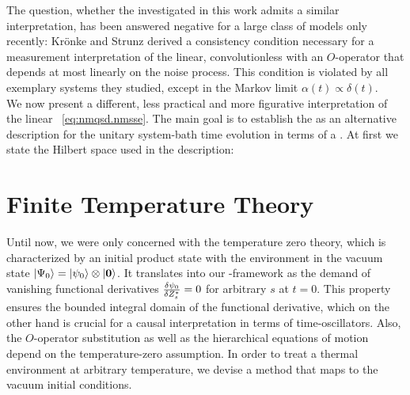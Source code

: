 The question, whether the \NMSSE investigated in this work admits a similar interpretation, has been answered negative for a large class of models only recently:
Krönke and Strunz \cite{KrSt12_trajectories} derived a consistency condition necessary for a measurement interpretation of the linear, convolutionless \NMSSE with an $O$-operator that depends at most linearly on the noise process.
This condition is violated by all exemplary systems they studied, except in the Markov limit $\alpha(t)\propto\delta(t)$.\\


We now present a different, less practical and more figurative interpretation of the linear \NMSSE~\ref{eq:nmqsd.nmsse}.
The main goal is to establish the \NMSSE as an alternative description for the unitary system-bath time evolution in terms of a .
At first we state the Hilbert space used in the description:


\section{Finite Temperature Theory}
\label{sec:nmqsd.temperature}
%

Until now, we were only concerned with the temperature zero theory, which is characterized by an initial product state with the environment in the vacuum state $| \Psi_0 \rangle = | \psi_0 \rangle \otimes | \boldsymbol{0} \rangle$.
It translates into our \NMSSE-framework as the demand of vanishing functional derivatives $\frac{\delta \psi_0}{\delta {Z}^*_s} = 0$ for arbitrary $s$ at $t=0$.
This property ensures the bounded integral domain of the functional derivative, which on the other hand is crucial for a causal interpretation in terms of time-oscillators.
Also, the $O$-operator substitution as well as the hierarchical equations of motion depend on the temperature-zero assumption.
In order to treat a thermal environment at arbitrary temperature, we devise a method that maps to the vacuum initial conditions.

